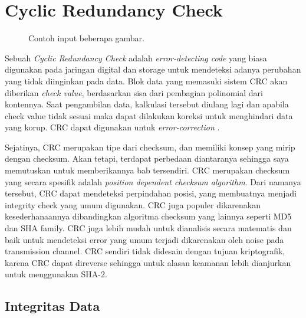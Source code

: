\section{Cyclic Redundancy Check}
\label{sec:crc}


\begin{figure*}
  \centering
  \hfil
  \caption{Contoh input beberapa gambar.}
  \label{fig:hasil}
\end{figure*}

Sebuah \emph{Cyclic Redundancy Check} adalah \emph{error-detecting code} yang biasa digunakan pada jaringan digital dan storage untuk mendeteksi adanya perubahan yang tidak diinginkan pada data. Blok data yang memasuki sistem CRC akan diberikan \emph{check value}, berdasarkan sisa dari pembagian polinomial dari kontennya. Saat pengambilan data, kalkulasi tersebut diulang lagi dan apabila check value tidak sesuai maka dapat dilakukan koreksi untuk menghindari data yang korup. CRC dapat digunakan untuk \emph{error-correction} \citep{dobbs2003}.

Sejatinya, CRC merupakan tipe dari checksum, dan memiliki konsep yang mirip dengan checksum. Akan tetapi, terdapat perbedaan diantaranya sehingga saya memutuskan untuk memberikannya bab tersendiri. CRC merupakan checksum yang secara spesifik adalah \emph{position dependent checksum algorithm}. Dari namanya tersebut, CRC dapat mendeteksi perpindahan posisi, yang membuatnya menjadi integrity check yang umum digunakan. CRC juga populer dikarenakan kesederhanaannya dibandingkan algoritma checksum yang lainnya seperti MD5 dan SHA family. CRC juga lebih mudah untuk dianalisis secara matematis dan baik untuk mendeteksi error yang umum terjadi dikarenakan oleh noise pada transmission channel. CRC sendiri tidak didesain dengan tujuan kriptografik, karena CRC dapat direverse sehingga untuk alasan keamanan lebih dianjurkan untuk menggunakan SHA-2.

\subsection{Integritas Data}
\label{subsec:crcdataintegrity}

